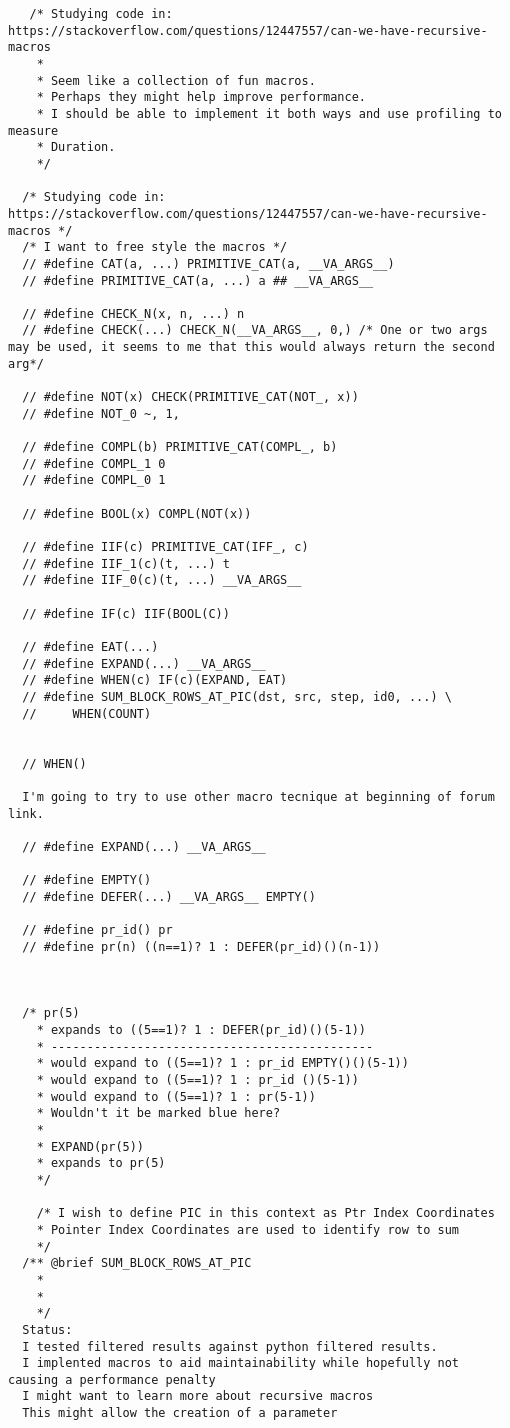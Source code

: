 \documentclass[12pt,oneside]{book}
\begin{document}
\begin{lstlisting}
   /* Studying code in: https://stackoverflow.com/questions/12447557/can-we-have-recursive-macros
    *
    * Seem like a collection of fun macros.
    * Perhaps they might help improve performance.
    * I should be able to implement it both ways and use profiling to measure
    * Duration.
    */

  /* Studying code in: https://stackoverflow.com/questions/12447557/can-we-have-recursive-macros */
  /* I want to free style the macros */
  // #define CAT(a, ...) PRIMITIVE_CAT(a, __VA_ARGS__)
  // #define PRIMITIVE_CAT(a, ...) a ## __VA_ARGS__
  
  // #define CHECK_N(x, n, ...) n
  // #define CHECK(...) CHECK_N(__VA_ARGS__, 0,) /* One or two args may be used, it seems to me that this would always return the second arg*/

  // #define NOT(x) CHECK(PRIMITIVE_CAT(NOT_, x))
  // #define NOT_0 ~, 1,

  // #define COMPL(b) PRIMITIVE_CAT(COMPL_, b)
  // #define COMPL_1 0
  // #define COMPL_0 1

  // #define BOOL(x) COMPL(NOT(x))

  // #define IIF(c) PRIMITIVE_CAT(IFF_, c)
  // #define IIF_1(c)(t, ...) t
  // #define IIF_0(c)(t, ...) __VA_ARGS__

  // #define IF(c) IIF(BOOL(C))

  // #define EAT(...)
  // #define EXPAND(...) __VA_ARGS__
  // #define WHEN(c) IF(c)(EXPAND, EAT)
  // #define SUM_BLOCK_ROWS_AT_PIC(dst, src, step, id0, ...) \
  //     WHEN(COUNT)


  // WHEN()

  I'm going to try to use other macro tecnique at beginning of forum link.

  // #define EXPAND(...) __VA_ARGS__
  
  // #define EMPTY()
  // #define DEFER(...) __VA_ARGS__ EMPTY()
  
  // #define pr_id() pr
  // #define pr(n) ((n==1)? 1 : DEFER(pr_id)()(n-1))
  


  /* pr(5)
    * expands to ((5==1)? 1 : DEFER(pr_id)()(5-1))
    * ---------------------------------------------
    * would expand to ((5==1)? 1 : pr_id EMPTY()()(5-1))
    * would expand to ((5==1)? 1 : pr_id ()(5-1))
    * would expand to ((5==1)? 1 : pr(5-1))
    * Wouldn't it be marked blue here?
    * 
    * EXPAND(pr(5))
    * expands to pr(5)
    */

    /* I wish to define PIC in this context as Ptr Index Coordinates
    * Pointer Index Coordinates are used to identify row to sum
    */
  /** @brief SUM_BLOCK_ROWS_AT_PIC
    * 
    * 
    */
  Status:
  I tested filtered results against python filtered results.
  I implented macros to aid maintainability while hopefully not causing a performance penalty
  I might want to learn more about recursive macros
  This might allow the creation of a parameter 


\end{lstlisting}
\end{document}
